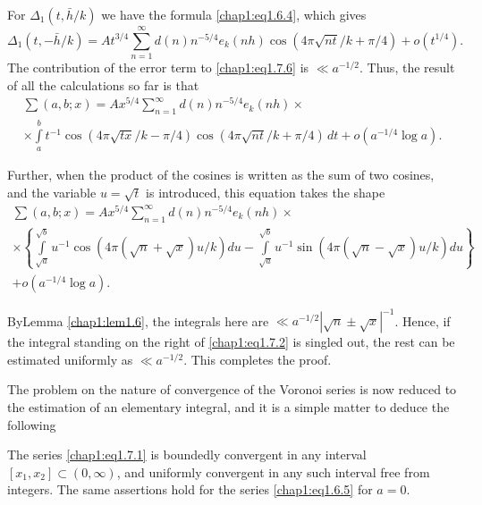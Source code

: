 For $\Delta_1(t,\bar{h}/k)$ we have the formula \eqref{chap1:eq1.6.4},
which gives 
$$
\Delta_1(t,-\bar{h}/k)=At^{3/4}\sum\limits_{n=1}^\infty d(n)n^{-5/4}e_k
(nh)\cos(4\pi\sqrt{nt}/k+\pi/4)+o(t^{1/4}).
$$
The contribution of the error term to \eqref{chap1:eq1.7.6} is $\ll
a^{-1/2}$. Thus, the result of all the calculations so far is that 
\begin{multline*}
\sum(a,b;x)=Ax^{5/4}\sum\limits_{n=1}^\infty d(n)n^{-5/4}e_k(nh)\times\\
\times\int\limits_a^b t^{-1}\cos(4\pi\sqrt{tx}/k-\pi/4)\cos(4\pi\sqrt{nt}/k
+\pi/4)\,dt +o(a^{-1/4}\log a).
\end{multline*}

Further, when the product of the cosines is written as the sum of two
cosines, and the variable $u=\sqrt{t}$ is introduced, this equation
takes the shape
\begin{multline*}
 \sum(a,b;x)=Ax^{5/4}\sum\limits_{n=1}^\infty d(n)n^{-5/4}e_k(nh)\times\\
 \times\left\{\int\limits_{\sqrt{a}}^{\sqrt{b}}u^{-1}\cos(4\pi(\sqrt{n}+
\sqrt{x})u/k)du-\int\limits_{\sqrt{a}}^{\sqrt{b}}u^{-1}\sin(4\pi
(\sqrt{n}-\sqrt{x})u/k)du\right\}\\
 +o(a^{-1/4}\log a).
\end{multline*}

By\pageoriginale Lemma \ref{chap1:lem1.6}, the integrals here are $\ll
a^{-1/2}|\sqrt{n}\pm\sqrt{x}|^{-1}$. Hence, if the integral standing
on the right of \eqref{chap1:eq1.7.2} is singled out, the rest can be
estimated uniformly as $\ll a^{-1/2}$. This completes the proof.

The problem on the nature of convergence of the Voronoi series is now
reduced to the estimation of an elementary integral, and it is a
simple matter to deduce the following

\begin{THM}\label{chap1:thm1.5}
The series \eqref{chap1:eq1.7.1} is boundedly convergent in any
interval $[x_1,x_2]\subset(0,\infty)$, and uniformly convergent in any
such interval free from integers. The same assertions hold for the
series \eqref{chap1:eq1.6.5} for $a=0$. 
\end{THM}

